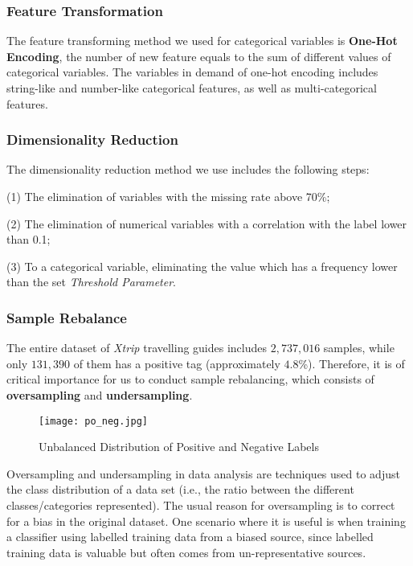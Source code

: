 \documentclass{article}
\begin{document}
    \subsubsection{Feature Transformation}
    The feature transforming method we used for categorical variables is \textbf{One-Hot Encoding}, the number of new feature equals to the sum of different values of categorical variables. The variables in demand of one-hot encoding includes string-like and number-like categorical features, as well as multi-categorical features. 

    \subsubsection{Dimensionality Reduction}
    The dimensionality reduction method we use includes the following steps:

    (1) The elimination of variables with the missing rate above 70\%;

    (2) The elimination of numerical variables with a correlation with the label lower than 0.1;

    (3) To a categorical variable, eliminating the value which has a frequency lower than the set \emph{Threshold Parameter}.  

    \subsubsection{Sample Rebalance}
    The entire dataset of \emph{Xtrip} travelling guides includes $2,737,016$ samples, while only $131,390$ of them has a positive tag (approximately $4.8$\%). Therefore, it is of critical importance for us to conduct sample rebalancing, which consists of \textbf{oversampling} and \textbf{undersampling}. 
    
    \begin{figure}[!h]
		\centering
		\texttt{[image: po\_neg.jpg]}
		\caption{\small{Unbalanced Distribution of Positive and Negative Labels}}
		\label{fig:pn}
	\end{figure}

    Oversampling and undersampling in data analysis are techniques used to adjust the class distribution of a data set (i.e., the ratio between the different classes/categories represented). The usual reason for oversampling is to correct for a bias in the original dataset. One scenario where it is useful is when training a classifier using labelled training data from a biased source, since labelled training data is valuable but often comes from un-representative sources.
\end{document}
